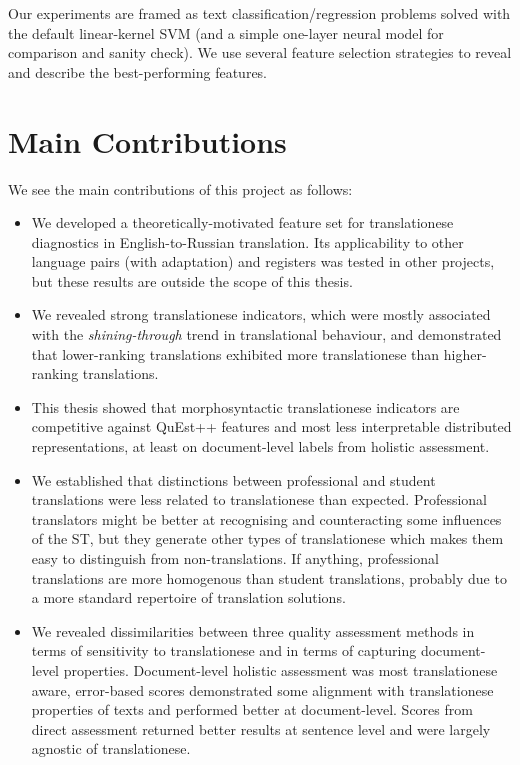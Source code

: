 Our experiments are framed as text classification/regression problems solved with the default linear-kernel \gls{SVM} (and a simple one-layer neural model for comparison and sanity check). We use several feature selection strategies to reveal and describe the best-performing features.

\section{\label{sec:contributions}Main Contributions}

We see the main contributions of this project as follows: 

\begin{itemize}\compresslist{}	
	\item We developed a theoretically-motivated feature set for translationese diagnostics in English-to-Russian translation. Its applicability to other language pairs (with adaptation) and registers was tested in other projects, but these results are outside the scope of this thesis.
	
	\item We revealed strong translationese indicators, which were mostly associated with the \textit{shining-through} trend in translational behaviour, and demonstrated that lower-ranking translations exhibited more translationese than higher-ranking translations.  
	
	\item This thesis showed that morphosyntactic translationese indicators are competitive against QuEst++ features and most less interpretable distributed representations, at least on document-level labels from holistic assessment. 
	
	\item We established that distinctions between professional and student translations were less related to translationese than expected. Professional translators might be better at recognising and counteracting some influences of the ST, but they generate other types of translationese which makes them easy to distinguish from non-translations. If anything, professional translations are more homogenous than student translations, probably due to a more standard repertoire of translation solutions. 
	
	\item We revealed dissimilarities between three quality assessment methods in terms of sensitivity to translationese and in terms of capturing document-level properties. Document-level holistic assessment was most translationese aware, error-based scores demonstrated some alignment with translationese properties of texts and performed better at document-level. Scores from direct assessment returned better results at sentence level and were largely agnostic of translationese. 
	

\end{itemize}
